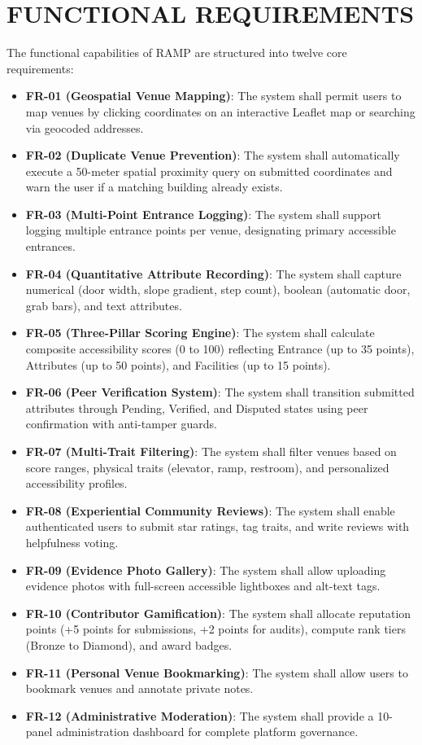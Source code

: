 \documentclass[12pt,a4paper]{report}
\begin{document}
\section{FUNCTIONAL REQUIREMENTS}
The functional capabilities of RAMP are structured into twelve core requirements:
\begin{itemize}
    \item \textbf{FR-01 (Geospatial Venue Mapping)}: The system shall permit users to map venues by clicking coordinates on an interactive Leaflet map or searching via geocoded addresses.
    \item \textbf{FR-02 (Duplicate Venue Prevention)}: The system shall automatically execute a 50-meter spatial proximity query on submitted coordinates and warn the user if a matching building already exists.
    \item \textbf{FR-03 (Multi-Point Entrance Logging)}: The system shall support logging multiple entrance points per venue, designating primary accessible entrances.
    \item \textbf{FR-04 (Quantitative Attribute Recording)}: The system shall capture numerical (door width, slope gradient, step count), boolean (automatic door, grab bars), and text attributes.
    \item \textbf{FR-05 (Three-Pillar Scoring Engine)}: The system shall calculate composite accessibility scores (0 to 100) reflecting Entrance (up to 35 points), Attributes (up to 50 points), and Facilities (up to 15 points).
    \item \textbf{FR-06 (Peer Verification System)}: The system shall transition submitted attributes through Pending, Verified, and Disputed states using peer confirmation with anti-tamper guards.
    \item \textbf{FR-07 (Multi-Trait Filtering)}: The system shall filter venues based on score ranges, physical traits (elevator, ramp, restroom), and personalized accessibility profiles.
    \item \textbf{FR-08 (Experiential Community Reviews)}: The system shall enable authenticated users to submit star ratings, tag traits, and write reviews with helpfulness voting.
    \item \textbf{FR-09 (Evidence Photo Gallery)}: The system shall allow uploading evidence photos with full-screen accessible lightboxes and alt-text tags.
    \item \textbf{FR-10 (Contributor Gamification)}: The system shall allocate reputation points (+5 points for submissions, +2 points for audits), compute rank tiers (Bronze to Diamond), and award badges.
    \item \textbf{FR-11 (Personal Venue Bookmarking)}: The system shall allow users to bookmark venues and annotate private notes.
    \item \textbf{FR-12 (Administrative Moderation)}: The system shall provide a 10-panel administration dashboard for complete platform governance.
\end{itemize}
\end{document}
